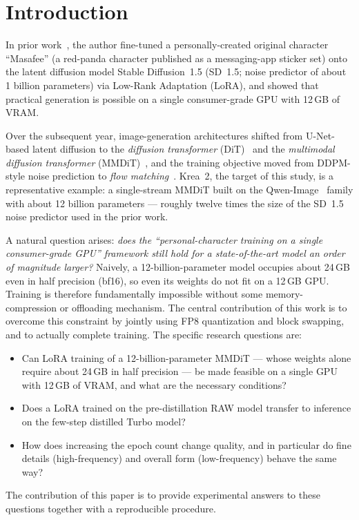 \documentclass[10pt,twocolumn]{article}
\begin{document}
\section{Introduction}
In prior work~\cite{suzuki2026sd15lora}, the author fine-tuned a personally-created original character ``Masafee'' (a red-panda character published as a messaging-app sticker set) onto the latent diffusion model Stable Diffusion~1.5 (SD~1.5; noise predictor of about 1 billion parameters) via Low-Rank Adaptation (LoRA), and showed that practical generation is possible on a single consumer-grade GPU with 12\,GB of VRAM.

Over the subsequent year, image-generation architectures shifted from U-Net-based latent diffusion to the \emph{diffusion transformer} (DiT)~\cite{peebles2023dit} and the \emph{multimodal diffusion transformer} (MMDiT)~\cite{esser2024sd3}, and the training objective moved from DDPM-style noise prediction to \emph{flow matching}~\cite{lipman2023flowmatching}. Krea~2, the target of this study, is a representative example: a single-stream MMDiT built on the Qwen-Image~\cite{qwenimage2025} family with about 12 billion parameters --- roughly twelve times the size of the SD~1.5 noise predictor used in the prior work.

A natural question arises: \emph{does the ``personal-character training on a single consumer-grade GPU'' framework still hold for a state-of-the-art model an order of magnitude larger?} Naively, a 12-billion-parameter model occupies about 24\,GB even in half precision (bf16), so even its weights do not fit on a 12\,GB GPU. Training is therefore fundamentally impossible without some memory-compression or offloading mechanism. The central contribution of this work is to overcome this constraint by jointly using FP8 quantization and block swapping, and to actually complete training. The specific research questions are:
\begin{itemize}[leftmargin=2.4em,topsep=2pt,itemsep=1pt]
  \item[\textbf{Q1.}] Can LoRA training of a 12-billion-parameter MMDiT --- whose weights alone require about 24\,GB in half precision --- be made feasible on a single GPU with 12\,GB of VRAM, and what are the necessary conditions?
  \item[\textbf{Q2.}] Does a LoRA trained on the pre-distillation RAW model transfer to inference on the few-step distilled Turbo model?
  \item[\textbf{Q3.}] How does increasing the epoch count change quality, and in particular do fine details (high-frequency) and overall form (low-frequency) behave the same way?
\end{itemize}
The contribution of this paper is to provide experimental answers to these questions together with a reproducible procedure.
\end{document}

